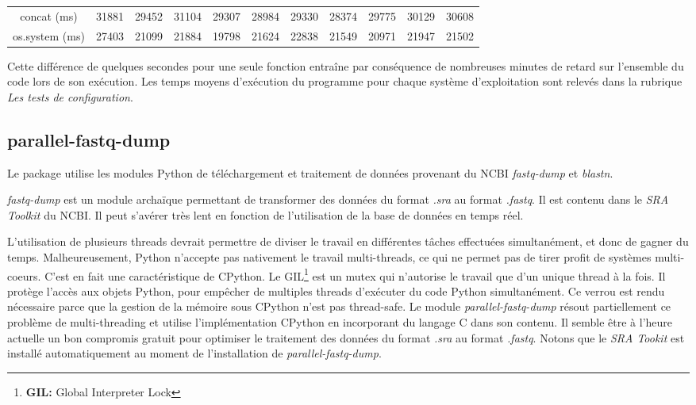 \documentclass[twoside,a4paper,11pt,frenchb,openany]{report}
\begin{document}
\begin{tabular}{c|c|c|c|c|c|c|c|c|c|c}
concat (ms) & 31881 & 29452 & 31104 & 29307 & 28984 & 29330 & 28374 & 29775 & 30129 & 30608 \\
os.system (ms) & 27403 & 21099 & 21884 & 19798 & 21624 & 22838 & 21549 & 20971 & 21947 & 21502
\end{tabular}

Cette différence de quelques secondes pour une seule fonction entraîne par conséquence de nombreuses minutes de retard sur l'ensemble du code lors de son exécution. Les temps moyens d'exécution du programme pour chaque système d'exploitation sont relevés dans la rubrique \textit{Les tests de configuration}.




\subsection{parallel-fastq-dump}

Le package utilise les modules Python de téléchargement et traitement de données provenant du NCBI \textit{fastq-dump} et \textit{blastn}. 

\textit{fastq-dump} est un module archaïque permettant de transformer des données du format \textit{.sra} au format \textit{.fastq}. Il est contenu dans le \textit{SRA Toolkit} du NCBI. Il peut s'avérer très lent en fonction de l'utilisation de la base de données en temps réel. 

L'utilisation de plusieurs threads devrait permettre de diviser le travail en différentes tâches effectuées simultanément, et donc de gagner du temps. Malheureusement, Python n'accepte pas nativement le travail multi-threads, ce qui ne permet pas de tirer profit de systèmes multi-coeurs. C'est en fait une caractéristique de CPython. Le GIL\footnote{\textbf{GIL:} Global Interpreter Lock} est un mutex qui n'autorise le travail que d'un unique thread à la fois. Il protège l'accès aux objets Python, pour empêcher de multiples threads d'exécuter du code Python simultanément. Ce verrou est rendu nécessaire parce que la gestion de la mémoire sous CPython n'est pas thread-safe. Le module \textit{parallel-fastq-dump} résout partiellement ce problème de multi-threading et utilise l'implémentation CPython en incorporant du langage C dans son contenu. Il semble être à l'heure actuelle un bon compromis gratuit pour optimiser le traitement des données du format \textit{.sra} au format \textit{.fastq}. Notons que le \textit{SRA Tookit} est installé automatiquement au moment de l'installation de \textit{parallel-fastq-dump}.
\end{document}
